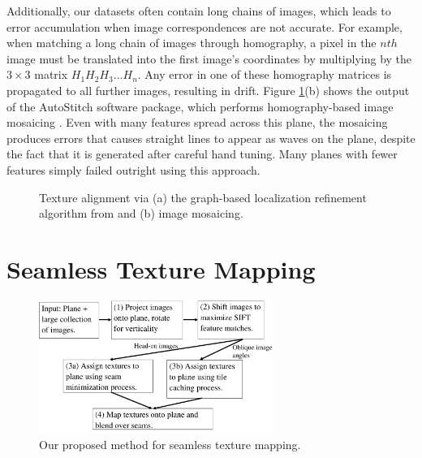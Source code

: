 \documentclass[10pt,twocolumn,letterpaper]{article}
\begin{document}
Additionally, our datasets often contain long chains of images, which
leads to error accumulation when image correspondences are not
accurate. For example, when matching a long chain of images through
homography, a pixel in the $nth$ image must be translated into the
first image's coordinates by multiplying by the $3\times3$ matrix $H_1
H_2 H_3 ... H_n$. Any error in one of these homography matrices is
propagated to all further images, resulting in drift. Figure
\ref{fig:mosaic3D}(b) shows the output of the AutoStitch software
package, which performs homography-based image mosaicing
\cite{autostitch}. Even with many features spread across this plane,
the mosaicing produces errors that causes straight lines to appear as
waves on the plane, despite the fact that it is generated after
careful hand tuning. Many planes with fewer features simply failed
outright using this approach.

\begin{figure}
  \centering

  \centering {}
  \caption{Texture alignment via (a) the graph-based localization
    refinement algorithm from \cite{chen2010indoor} and (b) image
    mosaicing.}
  \label{fig:mosaic3D}
\end{figure}




\section{Seamless Texture Mapping}
\label{sec:proposedApproach}

\begin{figure}
  \centering
  \includegraphics[width=3in]{pipeline.pdf}
  \caption{Our proposed method for seamless texture mapping.}
  \label{fig:pipeline}
\end{figure}
\end{document}
